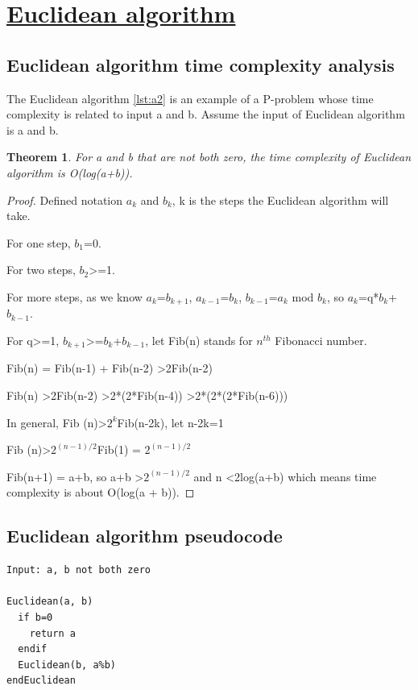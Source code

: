 \documentclass[12pt, oneside]{book}
\newtheorem{thm}{Theorem}
\begin{document}
\section{\underline{Euclidean algorithm}}
\subsection{Euclidean algorithm time complexity analysis}
The Euclidean algorithm \ref{lst:a2} is an example of a P-problem whose time complexity is related to input a and b. Assume the input of Euclidean algorithm is a and b. 
\begin{thm}
For a and b that are not both zero, the time complexity of Euclidean algorithm is O(log(a+b)). 
\end{thm}
\begin{proof}
Defined notation $a_k$ and $b_k$, k is the steps the Euclidean algorithm will take.\par 
For one step, $b_1$=0.\par
For two steps, $b_2$\textgreater=1.\par
For more steps, as we know $a_k$=$b_{k+1}$, $a_{k-1}$=$b_k$, $b_{k-1}$=$a_k$ mod $b_k$, so $a_k$=q*$b_k$+$b_{k-1}$. \par
For q\textgreater=1, $b_{k+1}$\textgreater=$b_k$+$b_{k-1}$, let Fib(n) stands for $n^{th}$ Fibonacci number.\par
Fib(n) = Fib(n-1) + Fib(n-2) \textgreater 2Fib(n-2)\par
Fib(n) \textgreater 2Fib(n-2) \textgreater 2*(2*Fib(n-4)) \textgreater 2*(2*(2*Fib(n-6)))\par
In general, Fib (n)\textgreater$2^k$Fib(n-2k), let n-2k=1\par
Fib (n)\textgreater$2^{(n-1)/2}$Fib(1) = $2^{(n-1)/2}$\par
Fib(n+1) = a+b, so a+b \textgreater $2^{(n-1)/2}$ and n \textless 2log(a+b)
which means time complexity is about O(log(a + b)).
\end{proof}

\subsection{Euclidean algorithm pseudocode}
\begin{spacing}{1.0}
\begin{lstlisting}[label={lst:a2}, caption=Greatest common divisor using Euclidean algorithm.]
Input: a, b not both zero

Euclidean(a, b)
  if b=0
    return a
  endif
  Euclidean(b, a%b)
endEuclidean  
\end{lstlisting}
\end{spacing}
\end{document}
